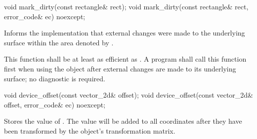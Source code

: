 \begin{itemdecl}
void mark_dirty(const rectangle& rect);
void mark_dirty(const rectangle& rect, error_code& ec) noexcept;
\end{itemdecl}
\begin{itemdescr}
	\pnum
	\effects
	Informs the implementation that external changes were made to the underlying surface within the area denoted by .
	
	\pnum
	\remarks
	This function shall be at least as efficient as . A program shall call this function first when using the  object after external changes are made to its underlying surface; no diagnostic is required.
\end{itemdescr}

\begin{itemdecl}
void device_offset(const vector_2d& offset);
void device_offset(const vector_2d& offset, error_code& ec) noexcept;
\end{itemdecl}
\begin{itemdescr}
	\pnum
	\effects
	Stores the value of . The value will be added to all coordinates after they have been transformed by the  object's transformation matrix.
\end{itemdescr}

